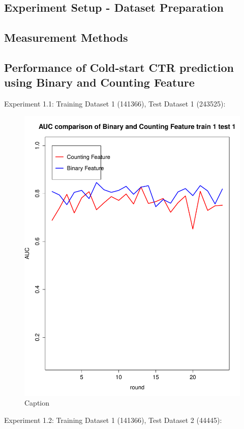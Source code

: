 \documentclass{sig-alternate}
\begin{document}
\begin{table}[h]
\subsection{Experiment Setup - Dataset Preparation}
\subsection{Measurement Methods}
\subsection{Performance of Cold-start CTR prediction using Binary and Counting Feature}

Experiment 1.1: Training Dataset 1 (141366), Test Dataset 1 (243525):
\begin{figure}
\centering
\includegraphics[width=1.\columnwidth]{imagescoldstart/train1test1.pdf}
\caption{Caption}
\label{fig:my_label}
\end{figure}


Experiment 1.2: Training Dataset 1 (141366), Test Dataset 2 (44445):


\end{table}
\end{document}
